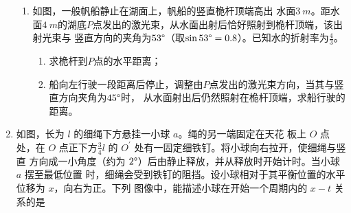 \begin{enumerate}
\begin{enumerate}
\item 
如图，一般帆船静止在湖面上，帆船的竖直桅杆顶端高出
水面$ 3 \ m $。距水面$ 4 \ m $的湖底$ P $点发出的激光束，从水面出射后恰好照射到桅杆顶端，该出射光束与
竖直方向的夹角为$ 53 \degree $（取$ \sin 53 \degree =0.8 $）。已知水的折射率为$  \frac{ 4 }{ 3 }  $。
\begin{enumerate}
	\item
求桅杆到$ P $点的水平距离；
\item 
船向左行驶一段距离后停止，调整由$ P $点发出的激光束方向，当其与竖直方向夹角为$ 45 \degree $时，
从水面射出后仍然照射在桅杆顶端，求船行驶的距离。
\end{enumerate}
\begin{figure}[h!]
	\flushright
	
\end{figure}



	
\end{enumerate}


\item 
{}
如图，长为 $ l $ 的细绳下方悬挂一小球 $ a $。绳的另一端固定在天花
板上 $ O $ 点处，在 $ O $ 点正下方$  \frac{ 3 }{ 4 } l $ 的 $ O ^{\prime}  $ 处有一固定细铁钉。将小球向右拉开，使细绳与竖直
方向成一小角度（约为 $ 2 \degree $）后由静止释放，并从释放时开始计时。当小球 $ a $ 摆至最低位置
时，细绳会受到铁钉的阻挡。设小球相对于其平衡位置的水平位移为 $ x $，向右为正。下列
图像中，能描述小球在开始一个周期内的 $ x-t $ 关系的是   

\begin{figure}[h!]
	\centering
	
\end{figure}


\end{enumerate}
